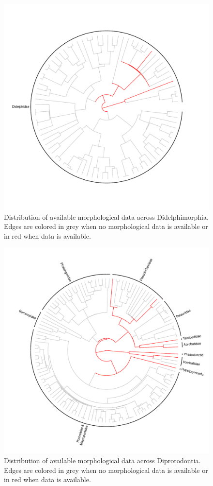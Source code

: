\begin{figure}[!htbp]
\centering
    \includegraphics[width=1\textwidth]{Supplementary/Supp_figure_DIDELPHIMORPHIA.pdf}
\caption{Distribution of available morphological data across Didelphimorphia. Edges are colored in grey when no morphological data is available or in red when data is available.}
\label{Supp_Figure_Phylo-Didelphimorphia}
\end{figure}

\begin{figure}[!htbp]
\centering
    \includegraphics[width=1\textwidth]{Supplementary/Supp_figure_DIPROTODONTIA.pdf}
\caption{Distribution of available morphological data across Diprotodontia. Edges are colored in grey when no morphological data is available or in red when data is available.}
\label{Supp_Figure_Phylo-Diprotodontia}
\end{figure}

